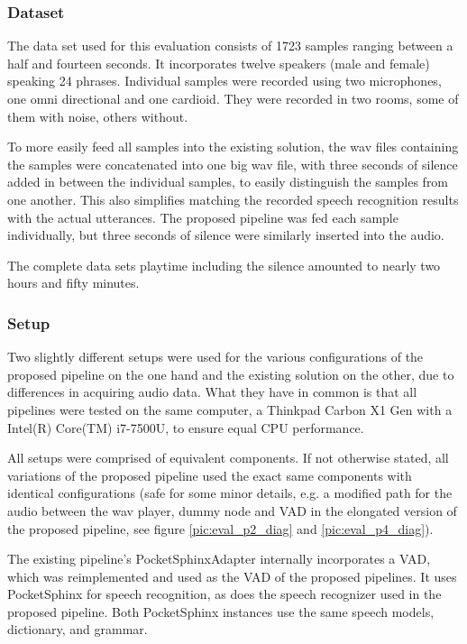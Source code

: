 \subsubsection{Dataset}
\label{eval:dataset:dataset}

The data set used for this evaluation consists of 1723 samples ranging between a half and fourteen seconds.
It incorporates twelve speakers (male and female) speaking 24 phrases. 
Individual samples were recorded using two microphones, one omni directional and one cardioid.
They were recorded in two rooms, some of them with noise, others without.

To more easily feed all samples into the existing solution, the wav files containing the samples were concatenated into one big wav file, with three seconds of silence added in between the individual samples, to easily distinguish the samples from one another.
This also simplifies matching the recorded speech recognition results with the actual utterances.
The proposed pipeline was fed each sample individually, but three seconds of silence were similarly inserted into the audio.

The complete data sets playtime including the silence amounted to nearly two hours and fifty minutes.

\subsubsection{Setup}
\label{eval:dataset:setup}

Two slightly different setups were used for the various configurations of the proposed pipeline on the one hand and the existing solution on the other, due to differences in acquiring audio data.
What they have in common is that all pipelines were tested on the same computer, a Thinkpad Carbon X1 Gen with a Intel(R) Core(TM) i7-7500U, to ensure equal CPU performance.

All setups were comprised of equivalent components. 
If not otherwise stated, all variations of the proposed pipeline used the exact same components with identical configurations (safe for some minor details, e.g. a modified path for the audio between the wav player, dummy node and VAD in the elongated version of the proposed pipeline, see figure \ref{pic:eval_p2_diag} and \ref{pic:eval_p4_diag}).

The existing pipeline's PocketSphinxAdapter internally incorporates a VAD, which was reimplemented and used as the VAD of the proposed pipelines.
It uses PocketSphinx for speech recognition, as does the speech recognizer used in the proposed pipeline. 
Both PocketSphinx instances use the same speech models, dictionary, and grammar.

